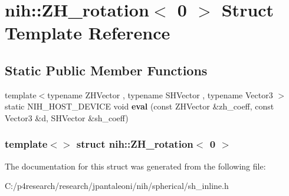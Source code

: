 \hypertarget{structnih_1_1_z_h__rotation_3_010_01_4}{
\section{nih\-:\-:\-Z\-H\-\_\-rotation$<$ 0 $>$ \-Struct \-Template \-Reference}
\label{structnih_1_1_z_h__rotation_3_010_01_4}
}
\subsection*{\-Static \-Public \-Member \-Functions}
\begin{DoxyCompactItemize}
\item 
\hypertarget{structnih_1_1_z_h__rotation_3_010_01_4_aad3ad0b1963ff699c40d0ed4b066f08d}{
{\footnotesize template$<$typename Z\-H\-Vector , typename S\-H\-Vector , typename Vector3 $>$ }\\static \-N\-I\-H\-\_\-\-H\-O\-S\-T\-\_\-\-D\-E\-V\-I\-C\-E void {\bfseries eval} (const \-Z\-H\-Vector \&zh\-\_\-coeff, const \-Vector3 \&d, \-S\-H\-Vector \&sh\-\_\-coeff)}
\label{structnih_1_1_z_h__rotation_3_010_01_4_aad3ad0b1963ff699c40d0ed4b066f08d}

\end{DoxyCompactItemize}
\subsubsection*{template$<$$>$ struct nih\-::\-Z\-H\-\_\-rotation$<$ 0 $>$}



\-The documentation for this struct was generated from the following file\-:\begin{DoxyCompactItemize}
\item 
\-C\-:/p4research/research/jpantaleoni/nih/spherical/sh\-\_\-inline.\-h\end{DoxyCompactItemize}
